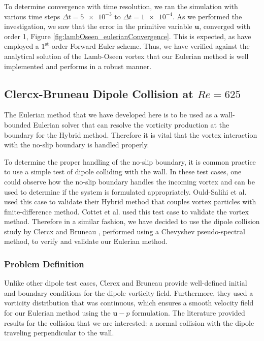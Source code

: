 To determine convergence with time resolution, we ran the simulation with various time steps $\Delta t = \num{5e-3}$ to $\Delta t = \num{1e-4}$. As we performed the investigation, we saw that the error in the primitive variable $\mathbf{u}$, converged with order 1, Figure \ref{fig:lambOseen_eulerianConvergence}. This is expected, as have employed a $1^{\mathrm{st}}$-order Forward Euler scheme. Thus, we have verified against the analytical solution of the Lamb-Oseen vortex that our Eulerian method is well implemented and performs in a robust manner.

\subsection{Clercx-Bruneau Dipole Collision at $Re=625$}
\label{subsec:eul_cbdc}
The Eulerian method that we have developed here is to be used as a wall-bounded Eulerian solver that can resolve the vorticity production at the boundary for the Hybrid method. Therefore it is vital that the vortex interaction with the no-slip boundary is handled properly.

To determine the proper handling of the no-slip boundary, it is common practice to use a simple test of dipole colliding with the wall. In these test cases, one could observe how the no-slip boundary handles the incoming vortex and can be used to determine if the system is formulated appropriately.  Ould-Salihi et al. \cite{Ould-Salihi2001a} used this case to validate their Hybrid method that couples vortex particles with finite-difference method. Cottet et al. \cite{Cottet2000b} used this test case to validate the vortex method. Therefore in a similar fashion, we have decided to use the dipole collision study by Clercx and Bruneau \cite{Clercx2006a}, performed using a Chevyshev pseudo-spectral method, to verify and validate our Eulerian method. 


\subsubsection*{Problem Definition}

Unlike other dipole test cases, Clercx and Bruneau provide well-defined initial and boundary conditions for the dipole vorticity field. Furthermore, they used a vorticity distribution that was continuous, which ensures a smooth velocity field for our Eulerian method using the $\mathbf{u}-p$ formulation. The literature provided results for the collision that we are interested: a normal collision with the dipole traveling perpendicular to the wall.


